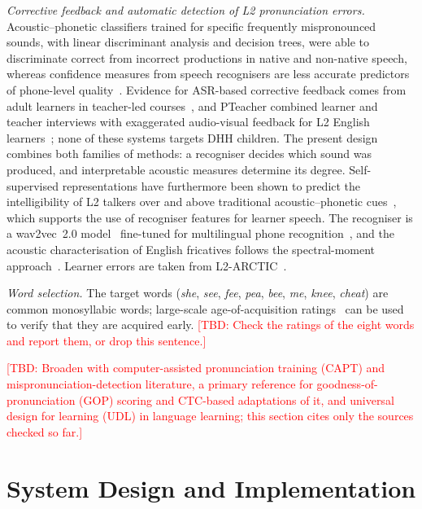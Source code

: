 \documentclass[conference]{IEEEtran}
\newcommand{\tbd}[1]{\textcolor{red}{[TBD: #1]}}
\begin{document}
\textit{Corrective feedback and automatic detection of L2 pronunciation errors.} Acoustic--phonetic classifiers trained for specific frequently mispronounced sounds, with linear discriminant analysis and decision trees, were able to discriminate correct from incorrect productions in native and non-native speech, whereas confidence measures from speech recognisers are less accurate predictors of phone-level quality~\cite{truong2005}. Evidence for ASR-based corrective feedback comes from adult learners in teacher-led courses~\cite{neri2006}, and PTeacher combined learner and teacher interviews with exaggerated audio-visual feedback for L2 English learners~\cite{bu2021}; none of these systems targets DHH children. The present design combines both families of methods: a recogniser decides which sound was produced, and interpretable acoustic measures determine its degree. Self-supervised representations have furthermore been shown to predict the intelligibility of L2 talkers over and above traditional acoustic--phonetic cues~\cite{kim2025}, which supports the use of recogniser features for learner speech. The recogniser is a wav2vec~2.0 model~\cite{baevski2020} fine-tuned for multilingual phone recognition~\cite{xu2022}, and the acoustic characterisation of English fricatives follows the spectral-moment approach~\cite{jongman2000}. Learner errors are taken from L2-ARCTIC~\cite{zhao2018}.

\textit{Word selection.} The target words (\textit{she}, \textit{see}, \textit{fee}, \textit{pea}, \textit{bee}, \textit{me}, \textit{knee}, \textit{cheat}) are common monosyllabic words; large-scale age-of-acquisition ratings~\cite{kuperman2012} can be used to verify that they are acquired early. \tbd{Check the ratings of the eight words and report them, or drop this sentence.}

\tbd{Broaden with computer-assisted pronunciation training (CAPT) and mispronunciation-detection literature, a primary reference for goodness-of-pronunciation (GOP) scoring and CTC-based adaptations of it, and universal design for learning (UDL) in language learning; this section cites only the sources checked so far.}

\section{System Design and Implementation}
\end{document}
